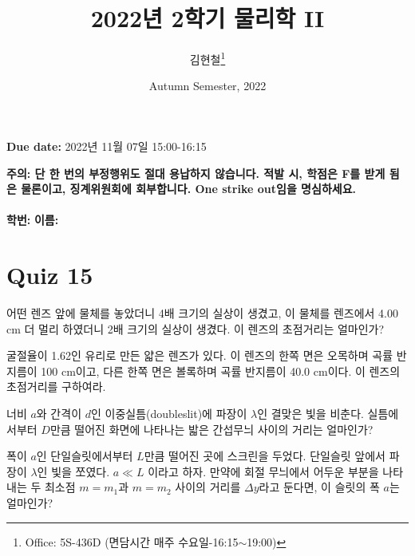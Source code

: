 \documentclass[tightenlines,floatfix,nofootinbib,superscriptaddress,fleqn]{revtex4}
\begin{document}
\title{\Large 2022년 2학기 물리학 II}
\author{김현철\footnote{Office: 5S-436D (면담시간 매주
    수요일-16:15$\sim$19:00)}} 
\date{Autumn Semester, 2022}

\maketitle

{\color{red} {\bf Due date:} 2022년 11월 07일  15:00-16:15 }
\vspace{1.cm}

\noindent \textbf{ 주의: \color{blue} 단 한 번의 부정행위도 절대
  용납하지 않습니다. 적발 시, 학점은 F를 받게 됨은 물론이고,
  징계위원회에 회부합니다. One strike out임을 명심하세요.} 
\\
\\

{\bf 학번:} \hspace{4cm}
{\bf 이름:} 

\section*{\large Quiz 15}
어떤 렌즈 앞에 물체를 놓았더니 4배 크기의 실상이 생겼고, 이 물체를
렌즈에서 4.00 cm 더 멀리 하였더니 2배 크기의 실상이 생겼다. 이 렌즈의
초점거리는 얼마인가? 
\newpage

굴절율이 1.62인 유리로 만든 얇은 렌즈가 있다. 이 렌즈의 한쪽 면은
오목하며 곡률 반지름이 100 cm이고, 다른 한쪽 면은 볼록하며
곡률 반지름이 40.0 cm이다. 이 렌즈의 초점거리를 구하여라. 
\newpage

너비 $a$와 간격이 $d$인 이중실틈(doubleslit)에 파장이 $\lambda$인
결맞은 빛을 비춘다. 실틈에서부터 $D$만큼 떨어진 화면에 나타나는 밟은
간섭무늬 사이의 거리는 얼마인가?

\newpage

폭이 $a$인 단일슬릿에서부터 $L$만큼 떨어진 곳에 스크린을
두었다. 단일슬릿 앞에서 파장이 $\lambda$인 빛을 쪼였다. $a\ll L$
이라고 하자. 만약에 회절 무늬에서 어두운 부분을 나타내는 두 최소점
$m=m_1$과 $m=m_2$ 사이의 거리를 $\Delta y$라고 둔다면, 이 슬릿의 폭
$a$는 얼마인가? 
\end{document}
